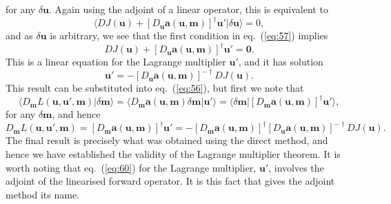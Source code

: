 for any $\delta \mathbf{u}$. Again using the adjoint of a linear operator, this is equivalent to
\begin{equation}
\langle DJ(\mathbf{u})+[D_{\mathbf{u}}\mathbf{a}(\mathbf{u},\mathbf{m})]^{\dagger}\mathbf{u}'|\delta \mathbf{u}\rangle=0,
\label{eq:59}
\end{equation}
and as $\delta \mathbf{u}$ is arbitrary, we see that the first condition in eq.~(\ref{eq:57}) implies
\begin{equation}
DJ(\mathbf{u})+[D_{\mathbf{u}}\mathbf{a}(\mathbf{u},\mathbf{m})]^{\dagger}\mathbf{u}'=\mathbf{0}.
\label{eq:60}
\end{equation}
This is a linear equation for the Lagrange multiplier $\mathbf{u}'$, and it has solution
\begin{equation}
\mathbf{u}'=-[D_{\mathbf{u}}\mathbf{a}(\mathbf{u},\mathbf{m})]^{-\dagger}DJ(\mathbf{u}).
\label{eq:61}
\end{equation}
This result can be substituted into eq.~(\ref{eq:56}), but first we note that
\begin{equation}
\langle D_{\mathbf{m}}L(\mathbf{u},\mathbf{u}',\mathbf{m})|\delta \mathbf{m}\rangle=\langle D_{\mathbf{m}}\mathbf{a}(\mathbf{u},\mathbf{m})\delta \mathbf{m}|\mathbf{u}'\rangle=\langle\delta \mathbf{m}|[D_{\mathbf{m}}\mathbf{a}(\mathbf{u},\mathbf{m})]^{\dagger}\mathbf{u}'\rangle,
\label{eq:62}
\end{equation}
for any $\delta \mathbf{m}$, and hence
\begin{equation}
D_{\mathbf{m}}L(\mathbf{u},\mathbf{u}',\mathbf{m})=[D_{\mathbf{m}}\mathbf{a}(\mathbf{u},\mathbf{m})]^{\dagger}\mathbf{u}'=-[D_{\mathbf{m}}\mathbf{a}(\mathbf{u},\mathbf{m})]^{\dagger}[D_{\mathbf{u}}\mathbf{a}(\mathbf{u},\mathbf{m})]^{-\dagger}DJ(\mathbf{u}).
\label{eq:63}
\end{equation}
The final result is precisely what was obtained using the direct method, and hence we have established the validity of the Lagrange multiplier theorem. It is worth noting that eq.~(\ref{eq:60}) for the Lagrange multiplier, $\mathbf{u}'$, involves the adjoint of the linearised forward operator. It is this fact that gives the adjoint method its name.
